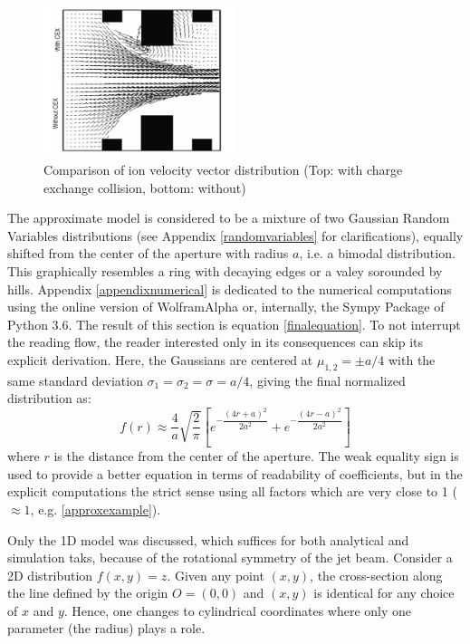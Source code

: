 \documentclass[twocolumn,12pt]{article}
\numberwithin{equation}{section} %
\numberwithin{equation}{section}
\begin{document}
\begin{figure}[H]
    \centering
    \includegraphics[width=0.5\textwidth]{figs/model2.PNG}
    \caption{Comparison of ion velocity vector distribution (Top: with charge exchange collision, bottom: without) \cite{lifetime1}}
    \label{model2pic}
\end{figure}

The approximate model is considered to be a mixture  of two Gaussian Random Variables distributions (see Appendix \ref{randomvariables} for clarifications), equally shifted from the center of the aperture with radius $a$, i.e. a bimodal distribution. This graphically resembles a ring with decaying edges or a valey sorounded by hills. Appendix \ref{appendixnumerical} is dedicated to the numerical computations using the online version of WolframAlpha \cite{wolframalpha} or, internally, the Sympy Package of Python 3.6.  The result of this section is equation \ref{finalequation}. To not interrupt the reading flow, the reader interested only in its consequences can skip its explicit derivation. Here, the Gaussians are centered at $\mu_{1,2} = \pm a/4$ with the same standard deviation $\sigma_1 = \sigma_2=\sigma = a/4$, giving the final normalized distribution as:
\begin{equation}
    f(r) \approx \dfrac{4}{a} \sqrt{\dfrac{2}{\pi}}\left[ e^{-\dfrac{(4r+a)^2}{2 a^2}} + e^{-\dfrac{(4r-a)^2}{2 a^2}} \right]
    \label{finaldistribution}
\end{equation}
where $r$ is the distance from the center of the aperture. The weak equality sign is used to provide a better equation in terms of readability of coefficients, but in the explicit computations the strict sense using all factors which are very close to 1 ($\approx 1$, e.g. \ref{approxexample}).

Only the 1D model was discussed, which suffices for both analytical and simulation taks, because of the rotational symmetry of the jet beam. Consider a 2D distribution $f(x,y) = z$. Given any point $(x,y)$, the cross-section along the line defined by the origin $O = (0,0)$ and $(x,y)$ is identical for any choice of $x$ and $y$. Hence, one changes to cylindrical coordinates where only one parameter (the radius) plays a role.
\end{document}
